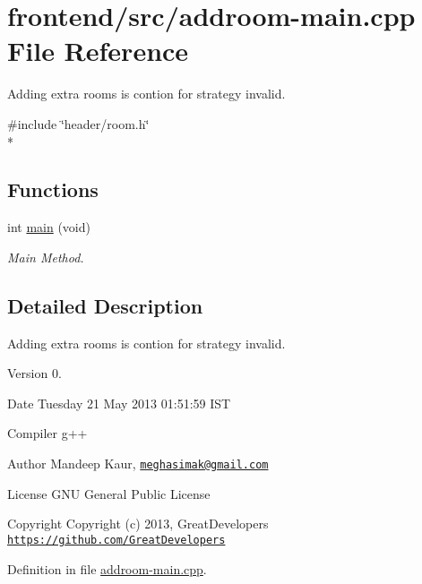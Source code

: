 \hypertarget{addroom-main_8cpp}{\section{frontend/src/addroom-\/main.cpp File Reference}
\label{addroom-main_8cpp}
}


Adding extra rooms is contion for strategy invalid.  


{\ttfamily \#include \char`\"{}header/room.\-h\char`\"{}}\\*
\subsection*{Functions}
\begin{DoxyCompactItemize}
\item 
int \hyperlink{addroom-main_8cpp_a568b3afc214ba30be5bf526d6b27b611}{main} (void)
\begin{DoxyCompactList}\small\item\em Main Method. \end{DoxyCompactList}\end{DoxyCompactItemize}


\subsection{Detailed Description}
Adding extra rooms is contion for strategy invalid. \begin{DoxyVersion}{Version}
0. 
\end{DoxyVersion}
\begin{DoxyDate}{Date}
Tuesday 21 May 2013 01\-:51\-:59 I\-S\-T\par
Compiler g++
\end{DoxyDate}
\begin{DoxyAuthor}{Author}
Mandeep Kaur, \href{mailto:meghasimak@gmail.com}{\tt meghasimak@gmail.\-com}\par
License G\-N\-U General Public License 
\end{DoxyAuthor}
\begin{DoxyCopyright}{Copyright}
Copyright (c) 2013, Great\-Developers \href{https://github.com/GreatDevelopers}{\tt https\-://github.\-com/\-Great\-Developers} 
\end{DoxyCopyright}


Definition in file \hyperlink{addroom-main_8cpp_source}{addroom-\/main.\-cpp}.



